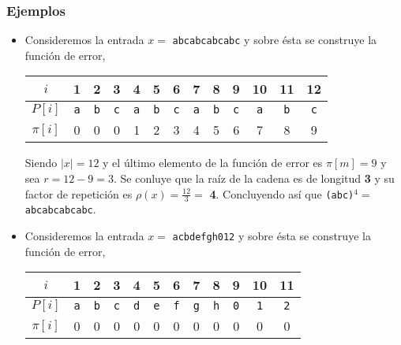 \subsubsection{Ejemplos}
\begin{itemize}
\item Consideremos la entrada $x =$ \texttt{abcabcabcabc} y sobre ésta se construye la función
de error, 
\begin{table}[h]
\centering
\begin{tabular}{c|c|c|c|c|c|c|c|c|c|c|c|c|}
\cline{2-13}
$i$      & 1          & 2          & 3          & 4          & 5          & 6          & 7          & 8          & 9          & 10         & 11         & 12         \\ \hline
$P[i]$   & \texttt{a} & \texttt{b} & \texttt{c} & \texttt{a} & \texttt{b} & \texttt{c} & \texttt{a} & \texttt{b} & \texttt{c} & \texttt{a} & \texttt{b} & \texttt{c} \\ \hline
$\pi[i]$ & 0          & 0          & 0          & 1          & 2          & 3          & 4          & 5          & 6          & 7          & 8          & 9          \\ \cline{2-13} 
\end{tabular}
\end{table}

Siendo $\vert x \vert = 12$ y el último elemento de la función de error es $\pi[m] = 9$ y sea
$r = 12 - 9 = 3$. Se conluye que la raíz de la cadena es de longitud \textbf{3} y su factor de
repetición es $\rho(x) = \frac{12}{3} =$ \textbf{4}. Concluyendo así que
\texttt{(abc)}$^4 = $ \texttt{abcabcabcabc}.

\item Consideremos la entrada $x =$ \texttt{acbdefgh012} y sobre ésta se construye la función
de error, 
\begin{table}[h]
\centering
\begin{tabular}{c|c|c|c|c|c|c|c|c|c|c|c|}
\cline{2-12}
$i$      & 1          & 2          & 3          & 4          & 5          & 6          & 7          & 8          & 9          & 10         & 11         \\ \hline
$P[i]$   & \texttt{a} & \texttt{b} & \texttt{c} & \texttt{d} & \texttt{e} & \texttt{f} & \texttt{g} & \texttt{h} & \texttt{0} & \texttt{1} & \texttt{2} \\ \hline
$\pi[i]$ & 0          & 0          & 0          & 0          & 0          & 0          & 0          & 0          & 0          & 0          & 0          \\ \cline{2-12} 
\end{tabular}
\end{table}


\end{itemize}
